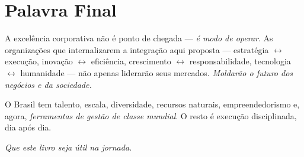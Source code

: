 \section*{Palavra Final}

A excelência corporativa não é ponto de chegada — \textit{é modo de operar}. As organizações que internalizarem a integração aqui proposta — estratégia $\leftrightarrow$ execução, inovação $\leftrightarrow$ eficiência, crescimento $\leftrightarrow$ responsabilidade, tecnologia $\leftrightarrow$ humanidade — não apenas liderarão seus mercados. \textit{Moldarão o futuro dos negócios e da sociedade.}

O Brasil tem talento, escala, diversidade, recursos naturais, empreendedorismo e, agora, \textit{ferramentas de gestão de classe mundial}. O resto é execução disciplinada, dia após dia.

\vspace{1cm}
\noindent\textit{Que este livro seja útil na jornada.}
